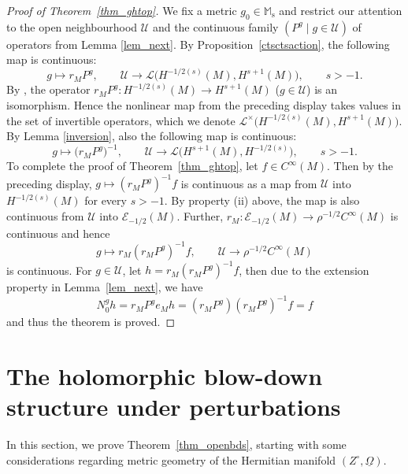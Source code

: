 \documentclass[pdftex]{sigma}
\numberwithin{equation}{section}
\theoremstyle{definition}
\newcommand{\M}{\mathbb{M}}
\newcommand{\1}{{\bf 1}}
\newcommand{\Om}{{\underline{\Omega}}}
\begin{document}
\begin{proof}[Proof of Theorem~\ref{thm_ghtop}] We fix a metric $g_0 \in \M_\mathrm{s}$ and restrict our attention to the open neighbourhood $\mathcal U$ and the continuous family $(P^g\mid g\in \mathcal U)$ of operators from Lemma \ref{lem_next}. By Proposition~\ref{ctsctsaction}, the following map is continuous:
\begin{equation*}
g\mapsto r_MP^g,\qquad \mathcal U\rightarrow \mathcal L\bigl(H^{-1/2(s)}(M),H^{s+1}(M)\bigr),\qquad s>-1.
\end{equation*}
By \cite[Theorem~4.4]{MNP19a}, the operator $r_MP^g \colon H^{-1/2(s)}(M)\rightarrow H^{s+1}(M)$ ($g\in \mathcal U$) is an isomorphism. Hence the nonlinear map from the preceding display takes values in the set of invertible operators, which we denote
$
\mathcal L^\times\bigl(H^{-1/2(s)}(M),H^{s+1}(M)\bigr)$.
By Lemma \ref{inversion}, also the following map is continuous:
\begin{equation*}
g\mapsto \bigl(r_M P^g\bigr)^{-1},\qquad \mathcal U \rightarrow \mathcal L\bigl(H^{s+1}(M),H^{-1/2(s)}\bigr),\qquad s>-1.
\end{equation*}
To complete the proof of Theorem~\ref{thm_ghtop}, let $f\in C^\infty(M)$. Then by the preceding display, $ g\mapsto (r_M P^g)^{-1} f$ is continuous as a map from $\mathcal U$ into $H^{-1/2(s)}(M)$ for every $s>-1$. By property (ii) above, the map is also continuous from $\mathcal U$ into $\mathcal E_{-1/2}(M)$. Further, $r_M\colon \mathcal E_{-1/2}(M)\rightarrow \rho^{-1/2}C^\infty(M)$ is continuous and hence
\begin{equation*}
g\mapsto r_M(r_MP^g)^{-1} f,\qquad \mathcal U\rightarrow \rho^{-1/2}C^\infty(M)
\end{equation*}
is continuous. For $g\in \mathcal U$, let $h=r_M(r_MP^g)^{-1} f$, then due to the extension property in Lemma~\ref{lem_next}, we have
\begin{equation*}
N_0^g h = r_M P^g e_M h = (r_MP^g)(r_MP^g)^{-1} f = f
\end{equation*}
and thus the theorem is proved.
\end{proof}

\section{The holomorphic blow-down structure under perturbations}\label{s_bds}

In this section, we prove Theorem~\ref{thm_openbds}, starting with some considerations regarding metric geometry of the Hermitian manifold $(Z^\circ,\Om)$.
\end{document}

